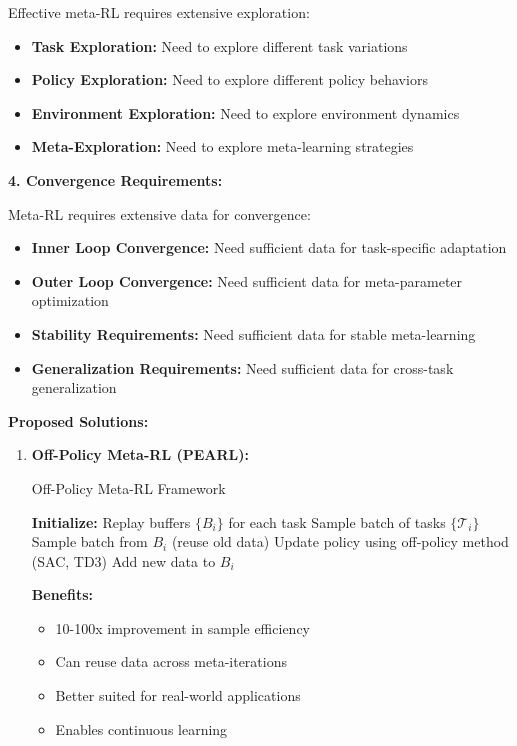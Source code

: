 \documentclass[12pt]{article}
\begin{document}
{{			Effective meta-RL requires extensive exploration:
			
			\begin{itemize}
				\item \textbf{Task Exploration:} Need to explore different task variations
				\item \textbf{Policy Exploration:} Need to explore different policy behaviors
				\item \textbf{Environment Exploration:} Need to explore environment dynamics
				\item \textbf{Meta-Exploration:} Need to explore meta-learning strategies
			\end{itemize}
			
			\textbf{4. Convergence Requirements:}
			
			Meta-RL requires extensive data for convergence:
			
			\begin{itemize}
				\item \textbf{Inner Loop Convergence:} Need sufficient data for task-specific adaptation
				\item \textbf{Outer Loop Convergence:} Need sufficient data for meta-parameter optimization
				\item \textbf{Stability Requirements:} Need sufficient data for stable meta-learning
				\item \textbf{Generalization Requirements:} Need sufficient data for cross-task generalization
			\end{itemize}
			
			\textbf{Proposed Solutions:}
			
			\begin{enumerate}
				\item \textbf{Off-Policy Meta-RL (PEARL):}
				
				\begin{algorithm}[H]
				\caption{Off-Policy Meta-RL Framework}
				\begin{algorithmic}[1]
				\STATE \textbf{Initialize:} Replay buffers $\{B_i\}$ for each task
				\STATE Sample batch of tasks $\{\mathcal{T}_i\}$
				\STATE Sample batch from $B_i$ (reuse old data)
				\STATE Update policy using off-policy method (SAC, TD3)
				\STATE Add new data to $B_i$
				\ENDFOR
				\ENDWHILE
				\end{algorithmic}
				\end{algorithm}
				
				\textbf{Benefits:}
				\begin{itemize}
					\item 10-100x improvement in sample efficiency
					\item Can reuse data across meta-iterations
					\item Better suited for real-world applications
					\item Enables continuous learning
				\end{itemize}
				

\end{enumerate}}}
\end{document}
